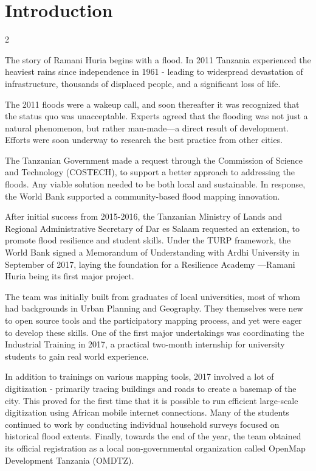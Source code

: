\documentclass[a4paper,12pt,twoside]{article}
\begin{document}
\section{Introduction}
\label{Introduction}
\begin{multicols} {2}

The story of Ramani Huria begins with a flood. In 2011 Tanzania experienced the heaviest rains since independence in 1961 - leading to widespread devastation of infrastructure, thousands of displaced people, and a significant loss of life. 

The 2011 floods were a wakeup call, and soon thereafter it was recognized that the status quo was unacceptable. Experts agreed that the flooding was not just a natural phenomenon, but rather man-made—a direct result of development. Efforts were soon underway to research the best practice from other cities. 

The Tanzanian Government made a request through the Commission of Science and Technology (COSTECH), to support a better approach to addressing the floods. Any viable solution needed to be both local and sustainable. In response, the World Bank supported a community-based flood mapping innovation.

After initial success from 2015-2016, the Tanzanian Ministry of Lands and Regional Administrative Secretary of Dar es Salaam requested an extension, to promote flood resilience and student skills. Under the TURP framework, the World Bank signed a Memorandum of Understanding with Ardhi University in September of 2017, laying the foundation for a Resilience Academy —Ramani Huria being its first major project.

The team was initially built from graduates of local universities, most of whom had backgrounds in Urban Planning and Geography. They themselves were new to open source tools and the participatory mapping process, and yet were eager to develop these skills. One of the first major undertakings was coordinating the Industrial Training in 2017, a practical two-month internship for university students to gain real world experience. 

In addition to trainings on various mapping tools, 2017  involved a lot of digitization - primarily tracing buildings and roads to create a basemap of the city. This proved for the first time  that it is possible to run efficient large-scale digitization using African mobile internet connections. Many of the students continued to work by conducting individual household surveys focused on historical flood extents. Finally, towards the end of the year, the team obtained its official registration as a local non-governmental organization called OpenMap Development Tanzania (OMDTZ). 


\end{multicols}
\end{document}
